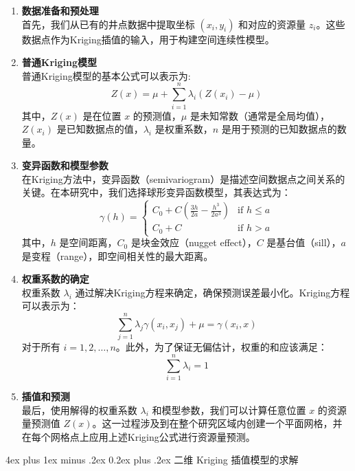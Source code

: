 \documentclass[12pt,a4paper]{nmmcm}
\makeatletter
\renewcommand\subsubsection{\@startsection{subsubsection}{3}{1em}%
  {4ex plus 1ex minus .2ex}%
  {0.2ex plus .2ex}%
  {\normalfont\large\bfseries}}
\makeatother
\begin{document}
\begin{enumerate}
  \item \textbf{数据准备和预处理} \\
        首先，我们从已有的井点数据中提取坐标 $(x_i, y_i)$ 和对应的资源量 $z_i$。这些数据点作为Kriging插值的输入，用于构建空间连续性模型。

  \item \textbf{普通Kriging模型} \\
        普通Kriging模型的基本公式可以表示为:
        \[
          Z(x) = \mu + \sum_{i=1}^n \lambda_i (Z(x_i) - \mu)
        \]
        其中，$Z(x)$ 是在位置 $x$ 的预测值，$\mu$ 是未知常数（通常是全局均值），$Z(x_i)$ 是已知数据点的值，$\lambda_i$ 是权重系数，$n$ 是用于预测的已知数据点的数量。

  \item \textbf{变异函数和模型参数} \\
        在Kriging方法中，变异函数（semivariogram）是描述空间数据点之间关系的关键。在本研究中，我们选择球形变异函数模型，其表达式为：
        \[
          \gamma(h) =
          \begin{cases}
            C_0 + C \left( \frac{3h}{2a} - \frac{h^3}{2a^3} \right) & \text{if } h \leq a \\
            C_0 + C                                                 & \text{if } h > a
          \end{cases}
        \]
        其中，$h$ 是空间距离，$C_0$ 是块金效应（nugget effect），$C$ 是基台值（sill），$a$ 是变程（range），即空间相关性的最大距离。

  \item \textbf{权重系数的确定} \\
        权重系数 $\lambda_i$ 通过解决Kriging方程来确定，确保预测误差最小化。Kriging方程可以表示为：
        \[
          \sum_{j=1}^n \lambda_j \gamma(x_i, x_j) + \mu = \gamma(x_i, x)
        \]
        对于所有 $i = 1, 2, \ldots, n$。此外，为了保证无偏估计，权重的和应该满足：
        \[
          \sum_{i=1}^n \lambda_i = 1
        \]

  \item \textbf{插值和预测} \\
        最后，使用解得的权重系数 $\lambda_i$ 和模型参数，我们可以计算任意位置 $x$ 的资源量预测值 $Z(x)$。这一过程涉及到在整个研究区域内创建一个平面网格，并在每个网格点上应用上述Kriging公式进行资源量预测。
\end{enumerate}

\subsubsection{二维 Kriging 插值模型的求解}
\end{document}
